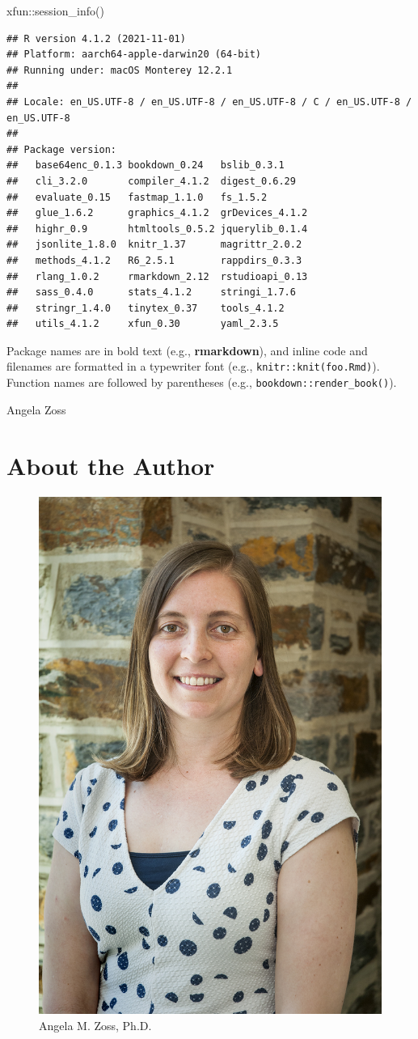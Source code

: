 \documentclass[
]{krantz}
\makeatletter
\newenvironment{Shaded}{\begin{snugshade}}{\end{snugshade}}
\newcommand{\FunctionTok}[1]{\textcolor[rgb]{0,0,0}{#1}}
\newcommand{\NormalTok}[1]{#1}
\newcommand{\SpecialCharTok}[1]{\textcolor[rgb]{0,0,0}{#1}}
\newenvironment{kframe}{%
\medskip{}
\setlength{\fboxsep}{.8em}
 \def\at@end@of@kframe{}%
 \ifinner\ifhmode%
  \def\at@end@of@kframe{\end{minipage}}%
  \begin{minipage}{\columnwidth}%
 \fi\fi%
 \def\FrameCommand##1{\hskip\@totalleftmargin \hskip-\fboxsep
 \colorbox{shadecolor}{##1}\hskip-\fboxsep
     \hskip-\linewidth \hskip-\@totalleftmargin \hskip\columnwidth}%
 \MakeFramed {\advance\hsize-\width
   \@totalleftmargin\z@ \linewidth\hsize
   \@setminipage}}%
 {\par\unskip\endMakeFramed%
 \at@end@of@kframe}
\renewenvironment{Shaded}{\begin{kframe}}{\end{kframe}}
\makeatother
\begin{document}
\begin{Shaded}
\begin{Highlighting}[]
\NormalTok{xfun}\SpecialCharTok{::}\FunctionTok{session\_info}\NormalTok{()}
\end{Highlighting}
\end{Shaded}

\begin{verbatim}
## R version 4.1.2 (2021-11-01)
## Platform: aarch64-apple-darwin20 (64-bit)
## Running under: macOS Monterey 12.2.1
## 
## Locale: en_US.UTF-8 / en_US.UTF-8 / en_US.UTF-8 / C / en_US.UTF-8 / en_US.UTF-8
## 
## Package version:
##   base64enc_0.1.3 bookdown_0.24   bslib_0.3.1    
##   cli_3.2.0       compiler_4.1.2  digest_0.6.29  
##   evaluate_0.15   fastmap_1.1.0   fs_1.5.2       
##   glue_1.6.2      graphics_4.1.2  grDevices_4.1.2
##   highr_0.9       htmltools_0.5.2 jquerylib_0.1.4
##   jsonlite_1.8.0  knitr_1.37      magrittr_2.0.2 
##   methods_4.1.2   R6_2.5.1        rappdirs_0.3.3 
##   rlang_1.0.2     rmarkdown_2.12  rstudioapi_0.13
##   sass_0.4.0      stats_4.1.2     stringi_1.7.6  
##   stringr_1.4.0   tinytex_0.37    tools_4.1.2    
##   utils_4.1.2     xfun_0.30       yaml_2.3.5
\end{verbatim}

Package names are in bold text (e.g., \textbf{rmarkdown}), and inline code and filenames are formatted in a typewriter font (e.g., \texttt{knitr::knit(\textquotesingle{}foo.Rmd\textquotesingle{})}). Function names are followed by parentheses (e.g., \texttt{bookdown::render\_book()}).

\begin{flushright}
Angela Zoss
\end{flushright}

\hypertarget{about-the-author}{%
\section*{About the Author}\label{about-the-author}}


\begin{figure}
\includegraphics[width=0.328\linewidth]{images/angela_zoss} \caption{Angela M. Zoss, Ph.D.}\label{fig:knitr-logo}
\end{figure}
\end{document}
